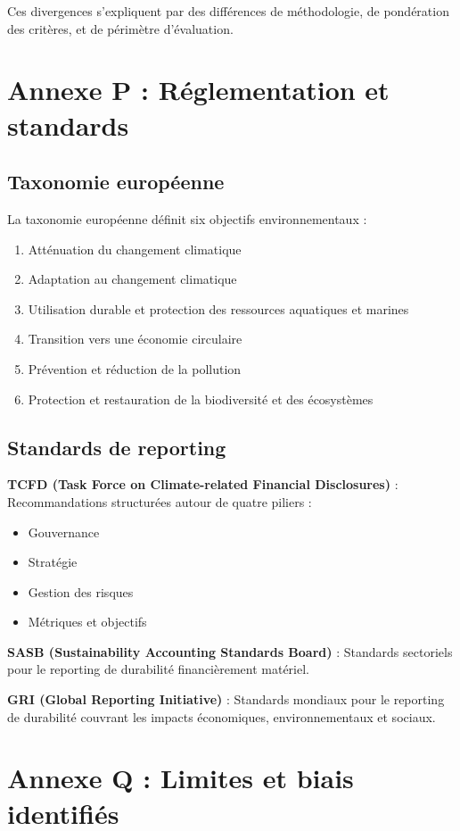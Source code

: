 \begin{table}[h]
\begin{table}[h]
\begin{table}[h]
\begin{table}[h]
\begin{table}[h]
\begin{table}[h]
\begin{table}[h]
Ces divergences s'expliquent par des différences de méthodologie, de pondération des critères, et de périmètre d'évaluation.

\section{Annexe P : Réglementation et standards}

\subsection{Taxonomie européenne}

La taxonomie européenne définit six objectifs environnementaux :
\begin{enumerate}
\item Atténuation du changement climatique
\item Adaptation au changement climatique
\item Utilisation durable et protection des ressources aquatiques et marines
\item Transition vers une économie circulaire
\item Prévention et réduction de la pollution
\item Protection et restauration de la biodiversité et des écosystèmes
\end{enumerate}

\subsection{Standards de reporting}

\textbf{TCFD (Task Force on Climate-related Financial Disclosures)} : Recommandations structurées autour de quatre piliers :
\begin{itemize}
\item Gouvernance
\item Stratégie
\item Gestion des risques
\item Métriques et objectifs
\end{itemize}

\textbf{SASB (Sustainability Accounting Standards Board)} : Standards sectoriels pour le reporting de durabilité financièrement matériel.

\textbf{GRI (Global Reporting Initiative)} : Standards mondiaux pour le reporting de durabilité couvrant les impacts économiques, environnementaux et sociaux.

\section{Annexe Q : Limites et biais identifiés}


\end{table}
\end{table}
\end{table}
\end{table}
\end{table}
\end{table}
\end{table}
